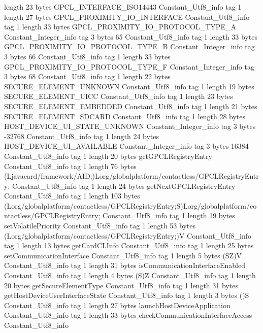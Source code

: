 {{{			length	23
			bytes	GPCL_INTERFACE_ISO14443
		}
		Constant_Utf8_info {
			tag	1
			length	27
			bytes	GPCL_PROXIMITY_IO_INTERFACE
		}
		Constant_Utf8_info {
			tag	1
			length	33
			bytes	GPCL_PROXIMITY_IO_PROTOCOL_TYPE_A
		}
		Constant_Integer_info {
			tag	3
			bytes	65
		}
		Constant_Utf8_info {
			tag	1
			length	33
			bytes	GPCL_PROXIMITY_IO_PROTOCOL_TYPE_B
		}
		Constant_Integer_info {
			tag	3
			bytes	66
		}
		Constant_Utf8_info {
			tag	1
			length	33
			bytes	GPCL_PROXIMITY_IO_PROTOCOL_TYPE_F
		}
		Constant_Integer_info {
			tag	3
			bytes	68
		}
		Constant_Utf8_info {
			tag	1
			length	22
			bytes	SECURE_ELEMENT_UNKNOWN
		}
		Constant_Utf8_info {
			tag	1
			length	19
			bytes	SECURE_ELEMENT_UICC
		}
		Constant_Utf8_info {
			tag	1
			length	23
			bytes	SECURE_ELEMENT_EMBEDDED
		}
		Constant_Utf8_info {
			tag	1
			length	21
			bytes	SECURE_ELEMENT_SDCARD
		}
		Constant_Utf8_info {
			tag	1
			length	28
			bytes	HOST_DEVICE_UI_STATE_UNKNOWN
		}
		Constant_Integer_info {
			tag	3
			bytes	-32768
		}
		Constant_Utf8_info {
			tag	1
			length	24
			bytes	HOST_DEVICE_UI_AVAILABLE
		}
		Constant_Integer_info {
			tag	3
			bytes	16384
		}
		Constant_Utf8_info {
			tag	1
			length	20
			bytes	getGPCLRegistryEntry
		}
		Constant_Utf8_info {
			tag	1
			length	76
			bytes	(Ljavacard/framework/AID;)Lorg/globalplatform/contactless/GPCLRegistryEntry;
		}
		Constant_Utf8_info {
			tag	1
			length	24
			bytes	getNextGPCLRegistryEntry
		}
		Constant_Utf8_info {
			tag	1
			length	103
			bytes	(Lorg/globalplatform/contactless/GPCLRegistryEntry;S)Lorg/globalplatform/contactless/GPCLRegistryEntry;
		}
		Constant_Utf8_info {
			tag	1
			length	19
			bytes	setVolatilePriority
		}
		Constant_Utf8_info {
			tag	1
			length	53
			bytes	(Lorg/globalplatform/contactless/GPCLRegistryEntry;)V
		}
		Constant_Utf8_info {
			tag	1
			length	13
			bytes	getCardCLInfo
		}
		Constant_Utf8_info {
			tag	1
			length	25
			bytes	setCommunicationInterface
		}
		Constant_Utf8_info {
			tag	1
			length	5
			bytes	(SZ)V
		}
		Constant_Utf8_info {
			tag	1
			length	31
			bytes	isCommunicationInterfaceEnabled
		}
		Constant_Utf8_info {
			tag	1
			length	4
			bytes	(S)Z
		}
		Constant_Utf8_info {
			tag	1
			length	20
			bytes	getSecureElementType
		}
		Constant_Utf8_info {
			tag	1
			length	31
			bytes	getHostDeviceUserInterfaceState
		}
		Constant_Utf8_info {
			tag	1
			length	3
			bytes	()S
		}
		Constant_Utf8_info {
			tag	1
			length	27
			bytes	launchHostDeviceApplication
		}
		Constant_Utf8_info {
			tag	1
			length	33
			bytes	checkCommunicationInterfaceAccess
		}
		Constant_Utf8_info {
}}}
